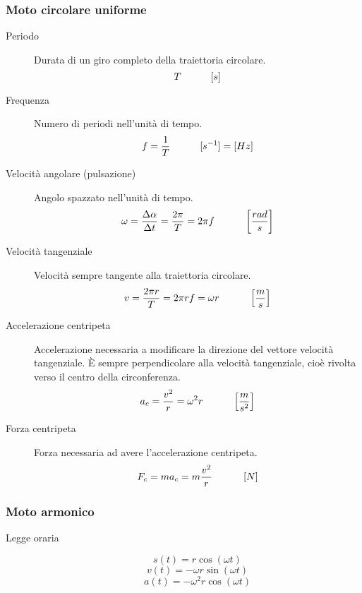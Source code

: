 \documentclass[a4paper,11pt,italian]{article}
\begin{document}
\subsubsection{Moto circolare uniforme}
\begin{description}
  \item[Periodo] 
  Durata di un giro completo della traiettoria circolare. 
  \[ T \hspace*{3em} [s] \]
  
  \item[Frequenza] 
  Numero di periodi nell'unità di tempo. 
  \[ f = \frac{1}{T} \hspace*{3em} [s^{-1}] = [ Hz] \]
  
  \item[Velocità angolare (pulsazione)] 
  Angolo spazzato nell'unità di tempo. 
  \[ \omega = \frac{\Delta\alpha}{\Delta t} = \frac{2 \pi}{T} = 2 \pi f \hspace*{3em} \left[ \frac{rad}{s} \right] \]
  
  \item[Velocità tangenziale] 
  Velocità sempre tangente alla traiettoria circolare. 
  \[ v = \frac{2 \pi r}{T} = 2\pi r f = \omega r  \hspace*{3em} \left[ \frac{m}{s} \right]\]
  
  \item[Accelerazione centripeta] 
  Accelerazione necessaria a modificare la direzione del vettore velocità tangenziale. È sempre perpendicolare alla velocità tangenziale, cioè rivolta verso il centro della circonferenza. 
  \[ a_c = \frac{v^2}{r} = \omega^2 r \hspace*{3em} \left[ \frac{m}{s^2} \right] \]
  
  \item[Forza centripeta] 
  Forza necessaria ad avere l'accelerazione centripeta. 
  \[ F_c = m  a_c = m  \frac{v^2}{r} \hspace*{3em} \left[ N \right] \]
\end{description}

\subsubsection{Moto armonico}
\begin{description}
  \item[Legge oraria]  
  \[ s(t) = r \cos(\omega t) \] 
  \[ v(t) = - \omega r  \sin(\omega t) \] 
  \[ a(t) = - \omega^2 r  \cos(\omega t) \]
\end{description}
\end{document}
